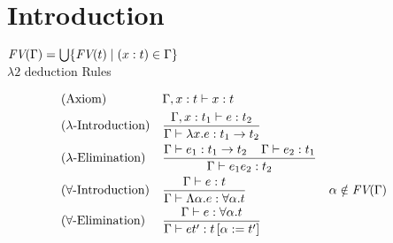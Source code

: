 \section{Introduction}
$\emph{FV}(\Gamma)=\bigcup\{\emph{FV}(t)\mid (x:t)\in \Gamma\}$\\
$\lambda2$ deduction Rules
\begin{mdframed}
\begingroup
\addtolength{\jot}{0.3cm}
\begin{align*}
&(\text{Axiom}) &&\Gamma,x:t\vdash x:t\\
&(\lambda\text{-Introduction}) &&\frac{\Gamma,x:t_1\vdash e:t_2}{\Gamma\vdash \lambda x.e:t_1\to t_2}\\
&(\lambda\text{-Elimination}) &&\frac{\Gamma\vdash e_1:t_1\to t_2 \hspace{0.4cm}\Gamma\vdash e_2:t_1}{\Gamma\vdash e_1e_2:t_2}\\
&(\forall\text{-Introduction}) &&\frac{\Gamma\vdash e:t}{\Gamma\vdash \Lambda\alpha.e:\forall\alpha.t} &&\alpha\notin\emph{FV}(\Gamma) \\
&(\forall\text{-Elimination}) &&\frac{\Gamma\vdash e:\forall\alpha.t }{\Gamma\vdash et':t\left[ \alpha:=t'\right] }
\end{align*}
\endgroup
\end{mdframed}
